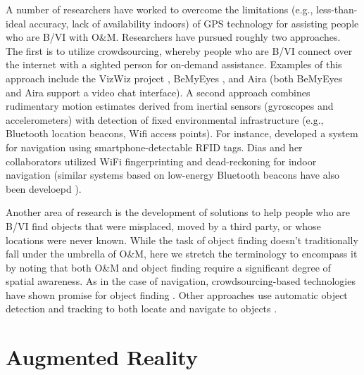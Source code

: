 \documentclass[chi_draft]{sigchi}
\newcommand{\BVI}{B/VI\xspace}
\newcommand{\OM}{O\&M\xspace}
\begin{document}
A number of researchers have worked to overcome the limitations (e.g., less-than-ideal accuracy, lack of availability indoors) of GPS technology for assisting people who are \BVI with \OM.  Researchers have pursued roughly two approaches.  The first is to utilize crowdsourcing, whereby people who are \BVI connect over the internet with a sighted person for on-demand assistance.  Examples of this approach include the VizWiz project \cite{bigham2010vizwiz}, BeMyEyes \cite{bemyeyesaccessworld}, and Aira \cite{aira} (both BeMyEyes and Aira support a video chat interface).  A second approach combines rudimentary motion estimates derived from inertial sensors (gyroscopes and accelerometers) with detection of fixed environmental infrastructure (e.g., Bluetooth location beacons, Wifi access points).  For instance, \cite{ganz2015percept, ganz2011percept, ganz2014percept} developed a system for navigation using smartphone-detectable RFID tags.  Dias and her collaborators utilized WiFi fingerprinting and dead-reckoning for indoor navigation \cite{Dias__2014_7778} (similar systems based on low-energy Bluetooth beacons have also been develoepd \cite{ishihara2017beacon, ahmetovic2016navcog, ahmetovic2017achieving}).

Another area of research is the development of solutions to help people who are \BVI find objects that were misplaced, moved by a third party, or whose locations were never known.  While the task of object finding doesn't traditionally fall under the umbrella of \OM, here we stretch the terminology to encompass it by noting that both \OM and object finding require a significant degree of spatial awareness.  As in the case of navigation, crowdsourcing-based technologies have shown promise for object finding \cite{bigham2010vizwizlocateit}.  Other approaches use automatic object detection and tracking to both locate and navigate to objects \cite{schauerte2012assistive, jafri2014computer, thakoor2014system}.

\section{Augmented Reality}
%
\end{document}
